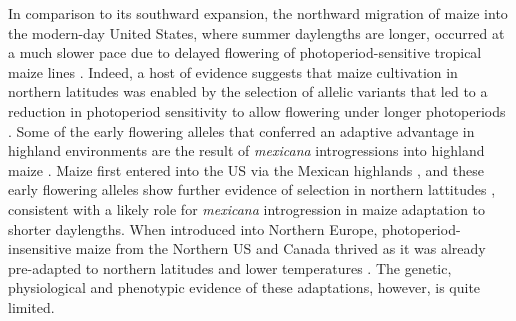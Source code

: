 \documentclass[9pt,twocolumn,twoside,lineno]{biorxiv}
\newcommand{\mex}{\textit{mexicana}\xspace}
\begin{document}
In comparison to its southward expansion, the northward migration of maize into the modern-day United States, where summer daylengths are longer, occurred at a much slower pace \cite{Da_Fonseca2015-zh, Swarts2017-ge} due to delayed flowering of photoperiod-sensitive tropical maize lines \cite{Hung2012-ms}.
Indeed, a host of evidence suggests that maize cultivation in northern latitudes was enabled by the selection of allelic variants that led to a reduction in photoperiod sensitivity to allow flowering under longer photoperiods \cite{Liang2018-af, Guo2018-on, Coles2010-db, Huang2018-ga, Yang2013-lg, Salvi2007-ku, Hung2012-ms}.
Some of the early flowering alleles that conferred an adaptive advantage in highland environments are the result of \mex introgressions into highland maize \cite{Guo2018-on}.
Maize first entered into the US via the Mexican highlands \cite{Da_Fonseca2015-zh}, and these early flowering alleles show further evidence of selection in northern lattitudes \cite{Guo2018-on}, consistent with a likely role for \mex introgression in maize adaptation to shorter daylengths. 
When introduced into Northern Europe, photoperiod-insensitive maize from the Northern US and Canada thrived as it was already pre-adapted to northern latitudes and lower temperatures \cite{Brandenburg2017-ii}.
The genetic, physiological and phenotypic evidence of these adaptations, however, is quite limited.
\end{document}
